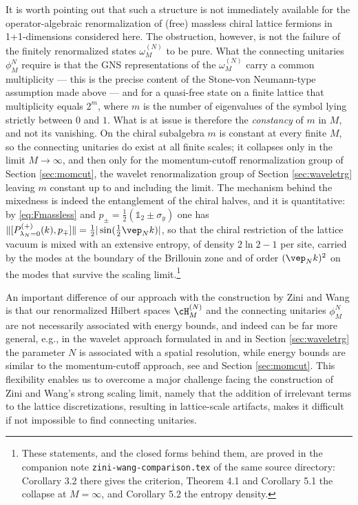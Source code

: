 \documentclass[a4paper, 11pt]{article}
\DeclareMathOperator{\1}{\mathds{1}}
\begin{document}
It is worth pointing out that such a structure is not immediately available for the operator-algebraic renormalization of (free) massless chiral lattice fermions in 1+1-dimensions considered here. The obstruction, however, is not the failure of the finitely renormalized states $\omega^{(N)}_{M}$ to be pure. What the connecting unitaries $\phi^{N}_{M}$ require is that the GNS representations of the $\omega^{(N)}_{M}$ carry a common multiplicity --- this is the precise content of the Stone-von Neumann-type assumption made above --- and for a quasi-free state on a finite lattice that multiplicity equals $2^{m}$, where $m$ is the number of eigenvalues of the symbol lying strictly between $0$ and $1$. What is at issue is therefore the \emph{constancy} of $m$ in $M$, and not its vanishing. On the chiral subalgebra $m$ is constant at every finite $M$, so the connecting unitaries do exist at all finite scales; it collapses only in the limit $M\rightarrow\infty$, and then only for the momentum-cutoff renormalization group of Section \ref{sec:momcut}, the wavelet renormalization group of Section \ref{sec:waveletrg} leaving $m$ constant up to and including the limit. The mechanism behind the mixedness is indeed the entanglement of the chiral halves, and it is quantitative: by \eqref{eq:Fmassless} and $p_{\pm} = \tfrac{1}{2}(\mathds{1}_{2}\pm\sigma_{y})$ one has $\|[P^{(+)}_{\lambda_{N}=0}(k),p_{\mp}]\| = \tfrac{1}{2}|\sin(\tfrac{1}{2}\vep_{N}k)|$, so that the chiral restriction of the lattice vacuum is mixed with an extensive entropy, of density $2\ln2-1$ per site, carried by the modes at the boundary of the Brillouin zone and of order $(\vep_{N}k)^{2}$ on the modes that survive the scaling limit.\footnote{These statements, and the closed forms behind them, are proved in the companion note \texttt{zini-wang-comparison.tex} of the same source directory: Corollary 3.2 there gives the criterion, Theorem 4.1 and Corollary 5.1 the collapse at $M=\infty$, and Corollary 5.2 the entropy density.}

An important difference of our approach with the construction by Zini and Wang is that our renormalized Hilbert spaces $\cH_{M}^{(N)}$ and the connecting unitaries $\phi^{N}_{M}$ are not necessarily associated with energy bounds, and indeed can be far more general, e.g., in the wavelet approach formulated in \cite{StottmeisterOperatorAlgebraicRenormalization} and in Section \ref{sec:waveletrg} the parameter $N$ is associated with a spatial resolution, while energy bounds are similar to the momentum-cutoff approach, see \cite{MorinelliScalingLimitsOf} and Section \ref{sec:momcut}. This flexibility enables us to overcome a major challenge facing the construction of Zini and Wang's strong scaling limit, namely that the addition of irrelevant terms to the lattice discretizations, resulting in lattice-scale artifacts, makes it difficult if not impossible to find connecting unitaries. 
\end{document}
